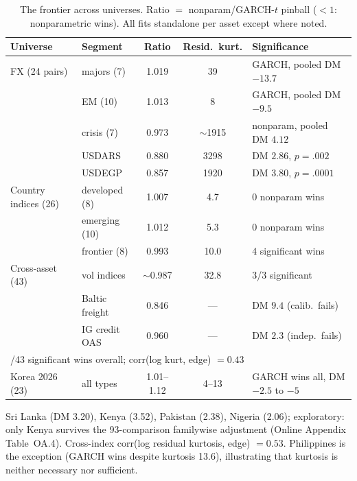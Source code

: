 \documentclass[11pt]{article}
\theoremstyle{remark}
\begin{document}
\begin{table}[t]
\centering
\begin{threeparttable}
\caption{The frontier across universes. Ratio $=$
nonparam/GARCH-$t$ pinball ($<1$: nonparametric wins). All fits
standalone per asset except where noted.}
\label{tab:universes}
\footnotesize\setlength{\tabcolsep}{4pt}
\begin{tabular}{llccl}
\toprule
Universe & Segment & Ratio & Resid.\ kurt. & Significance \\
\midrule
FX (24 pairs) & majors (7) & 1.019 & 39 & GARCH, pooled DM $-13.7$ \\
 & EM (10) & 1.013 & 8 & GARCH, pooled DM $-9.5$ \\
 & crisis (7) & 0.973 & $\sim$1915 & nonparam, pooled DM $4.12$ \\
 & \quad USDARS & 0.880 & 3298 & DM $2.86$, $p=.002$ \\
 & \quad USDEGP & 0.857 & 1920 & DM $3.80$, $p=.0001$ \\
\midrule
Country indices (26) & developed (8) & 1.007 & 4.7 & 0 nonparam wins \\
 & emerging (10) & 1.012 & 5.3 & 0 nonparam wins \\
 & frontier (8) & 0.993 & 10.0 & 4 significant wins\tnote{a} \\
\midrule
Cross-asset (43) & vol indices & $\sim$0.987 & 32.8 & 3/3 significant \\
 & Baltic freight & 0.846 & --- & DM $9.4$ (calib.\ fails) \\
 & IG credit OAS & 0.960 & --- & DM $2.3$ (indep.\ fails) \\
\multicolumn{5}{l}{\quad 13/43 significant wins overall; corr(log kurt, edge) $= 0.43$} \\
\midrule
Korea 2026 (23) & all types & 1.01--1.12 & 4--13 & GARCH wins all, DM $-2.5$ to $-5$ \\
\bottomrule
\end{tabular}
\begin{tablenotes}\footnotesize
\item[a] Sri Lanka (DM 3.20), Kenya (3.52), Pakistan (2.38), Nigeria (2.06); exploratory: only Kenya survives the 93-comparison
familywise adjustment (Online Appendix Table~OA.4). Cross-index corr(log residual kurtosis, edge) $= 0.53$.
Philippines is the exception (GARCH wins despite kurtosis 13.6),
illustrating that kurtosis is neither necessary nor sufficient.
\end{tablenotes}
\end{threeparttable}
\end{table}
\end{document}
